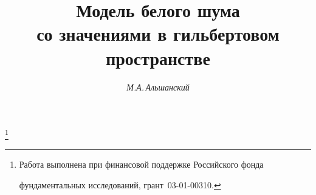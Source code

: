 






\newcommand{\la}{\langle}


\newcommand{\ra}{\rangle}


\newcommand{\tts}[1]{}







\setcounter{page}{10}

















\author{\it М.А.\,Альшанский}




\title{Модель белого шума\\


со значениями в гильбертовом пространстве}


\thanks{Работа выполнена при финансовой поддержке Российского фонда


фундаментальных исследований, грант \No\,03-01-00310.}











\date{}




\pagestyle{plain} %





